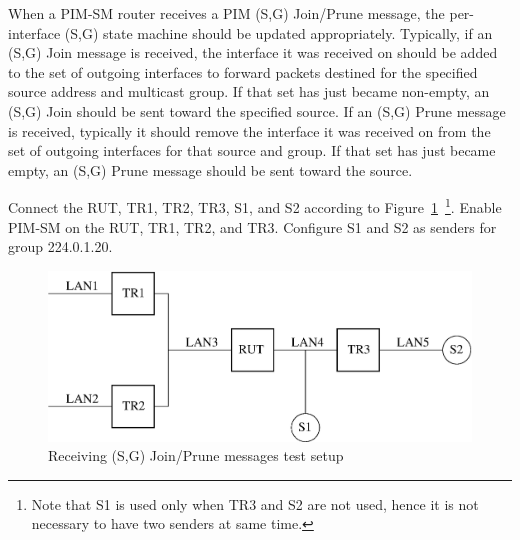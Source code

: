 \documentclass[11pt]{report}
\begin{document}
When a PIM-SM router receives a PIM (S,G) Join/Prune message, the
per-interface (S,G) state machine should be updated appropriately.
Typically, if an (S,G) Join message is received, the interface it was
received on should be added to the set of outgoing interfaces to
forward packets destined for the specified source address and multicast group.
If that set has just became non-empty, an (S,G) Join should be sent
toward the specified source.
If an (S,G) Prune message is received, typically it should remove
the interface it was received on from the set of outgoing interfaces
for that source and group. If
that set has just became empty, an (S,G) Prune message should be
sent toward the source.

Connect the RUT, TR1, TR2, TR3, S1, and S2 according to
Figure~\ref{fig:pim_test_4_3_receiving_sg_join_prune_messages}~\footnote{Note
that S1 is used only when TR3 and S2 are not used, hence it is not necessary
to have two senders at same time.}.
Enable PIM-SM on the RUT, TR1, TR2, and TR3.
Configure S1 and S2 as senders for group 224.0.1.20.

\begin{figure}[htbp]
  \begin{center}
    \includegraphics[scale=0.8]{figs/pim_test_4_3_receiving_sg_join_prune_messages}
    \caption{Receiving (S,G) Join/Prune messages test setup}
    \label{fig:pim_test_4_3_receiving_sg_join_prune_messages}
  \end{center}
\end{figure}


\end{document}
